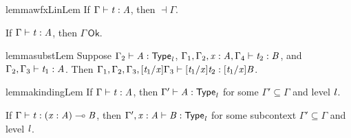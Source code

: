 \begin{restatable}{lemma}{wfxLinLem}
  \label{lemma:well-formed_context_linearity}
  If $\Gamma  \vdash  \mathit{t}  :  \mathit{A}$, then $\dashv  \Gamma$.
\end{restatable}

\begin{corollary}
  \label{corollary:well-formed_contexts}
  If $\Gamma  \vdash  \mathit{t}  :  \mathit{A}$, then $ \Gamma \,\mathsf{Ok} $.
\end{corollary}

\begin{restatable}{lemma}{substLem}
  \label{lemma:substitution_for_typing}  
  Suppose
  $\Gamma_{{\mathrm{2}}}  \vdash  \mathit{A}  :   \mathsf{Type}_{ \mathit{l} } $,
  $\Gamma_{{\mathrm{1}}}  ,  \Gamma_{{\mathrm{2}}}  ,  \mathit{x}  :  \mathit{A}  ,  \Gamma_{{\mathrm{4}}}  \vdash  \mathit{t_{{\mathrm{2}}}}  :  \mathit{B}$, and
  $\Gamma_{{\mathrm{2}}}  ,  \Gamma_{{\mathrm{3}}}  \vdash  \mathit{t_{{\mathrm{1}}}}  :  \mathit{A}$.  Then
  $\Gamma_{{\mathrm{1}}}  ,  \Gamma_{{\mathrm{2}}}  ,  \Gamma_{{\mathrm{3}}}  ,  [  \mathit{t_{{\mathrm{1}}}}  /  \mathit{x}  ]  \Gamma_{{\mathrm{3}}}  \vdash  [  \mathit{t_{{\mathrm{1}}}}  /  \mathit{x}  ]  \mathit{t_{{\mathrm{2}}}}  :  [  \mathit{t_{{\mathrm{1}}}}  /  \mathit{x}  ]  \mathit{B}$.
\end{restatable}

\begin{restatable}{lemma}{kindingLem}
  \label{lemma:kinding_for_typing}
If $\Gamma  \vdash  \mathit{t}  :  \mathit{A}$, then $\Gamma'  \vdash  \mathit{A}  :   \mathsf{Type}_{ \mathit{l} } $ for some $\Gamma' \subseteq \Gamma$ and level $\mathit{l}$.
\end{restatable}

\begin{lemma}
  \label{lemma:arrow_kinding}
  If $\Gamma  \vdash  \mathit{t}  :  (  \mathit{x}  :  \mathit{A}  )  \multimap  \mathit{B}$, then $\Gamma'  ,  \mathit{x}  :  \mathit{A}  \vdash  \mathit{B}  :   \mathsf{Type}_{ \mathit{l} } $
  for some subcontext $\Gamma' \subseteq \Gamma$ and level $\mathit{l}$.
\end{lemma}

